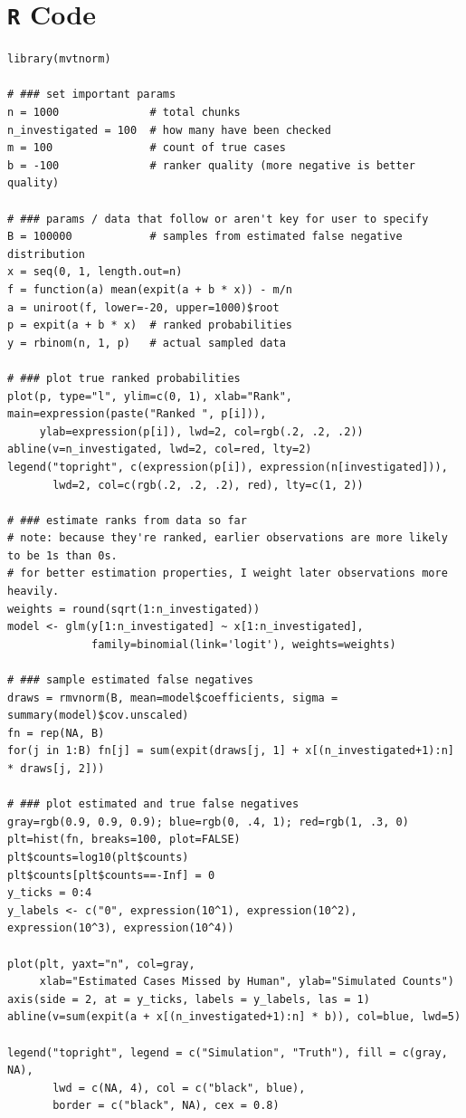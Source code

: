 \documentclass{article}
\begin{document}
\newpage
\section{\texttt{R} Code}
\begin{verbatim}
library(mvtnorm)

# ### set important params
n = 1000              # total chunks
n_investigated = 100  # how many have been checked
m = 100               # count of true cases
b = -100              # ranker quality (more negative is better quality)

# ### params / data that follow or aren't key for user to specify
B = 100000            # samples from estimated false negative distribution
x = seq(0, 1, length.out=n)
f = function(a) mean(expit(a + b * x)) - m/n
a = uniroot(f, lower=-20, upper=1000)$root
p = expit(a + b * x)  # ranked probabilities
y = rbinom(n, 1, p)   # actual sampled data

# ### plot true ranked probabilities
plot(p, type="l", ylim=c(0, 1), xlab="Rank", main=expression(paste("Ranked ", p[i])),
     ylab=expression(p[i]), lwd=2, col=rgb(.2, .2, .2))
abline(v=n_investigated, lwd=2, col=red, lty=2)
legend("topright", c(expression(p[i]), expression(n[investigated])),
       lwd=2, col=c(rgb(.2, .2, .2), red), lty=c(1, 2))

# ### estimate ranks from data so far
# note: because they're ranked, earlier observations are more likely to be 1s than 0s.
# for better estimation properties, I weight later observations more heavily.
weights = round(sqrt(1:n_investigated))
model <- glm(y[1:n_investigated] ~ x[1:n_investigated], 
             family=binomial(link='logit'), weights=weights)

# ### sample estimated false negatives
draws = rmvnorm(B, mean=model$coefficients, sigma = summary(model)$cov.unscaled)
fn = rep(NA, B)
for(j in 1:B) fn[j] = sum(expit(draws[j, 1] + x[(n_investigated+1):n] * draws[j, 2]))

# ### plot estimated and true false negatives
gray=rgb(0.9, 0.9, 0.9); blue=rgb(0, .4, 1); red=rgb(1, .3, 0)
plt=hist(fn, breaks=100, plot=FALSE)
plt$counts=log10(plt$counts)
plt$counts[plt$counts==-Inf] = 0
y_ticks = 0:4
y_labels <- c("0", expression(10^1), expression(10^2), expression(10^3), expression(10^4))

plot(plt, yaxt="n", col=gray,
     xlab="Estimated Cases Missed by Human", ylab="Simulated Counts")
axis(side = 2, at = y_ticks, labels = y_labels, las = 1)
abline(v=sum(expit(a + x[(n_investigated+1):n] * b)), col=blue, lwd=5)

legend("topright", legend = c("Simulation", "Truth"), fill = c(gray, NA), 
       lwd = c(NA, 4), col = c("black", blue),
       border = c("black", NA), cex = 0.8)
\end{verbatim}
\end{document}
